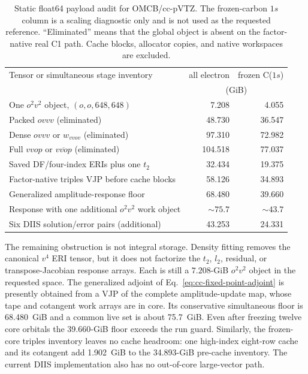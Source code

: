 \documentclass[11pt]{article}
\begin{document}
\begin{table}[htbp]
 \centering
 \caption{Static float64 payload audit for OMCB/cc-pVTZ.  The frozen-carbon
 $1s$ column is a scaling diagnostic only and is not used as the requested
 reference.  ``Eliminated'' means that the global object is absent on the
 factor-native real C1 path.  Cache blocks, allocator copies, and native
 workspaces are excluded.}
 \label{tab:omcb-ccpvtz-cc-memory}
 \scriptsize
 \setlength{\tabcolsep}{4pt}
 \begin{tabular}{@{}lrr@{}}
  \toprule
  Tensor or simultaneous stage inventory & all electron & frozen C($1s$) \\
   & \multicolumn{2}{c}{(GiB)} \\
  \midrule
  One $o^2v^2$ object, $(o,o,648,648)$ & 7.208 & 4.055 \\
  Packed $ovvv$ (eliminated) & 48.730 & 36.547 \\
  Dense $ovvv$ or $w_{vvov}$ (eliminated) & 97.310 & 72.982 \\
  Full $vvop$ or $\overline{vvop}$ (eliminated) & 104.518 & 77.037 \\
  Saved DF/four-index ERIs plus one $t_2$ & 32.434 & 19.375 \\
  Factor-native triples VJP before cache blocks & 58.126 & 34.893 \\
  Generalized amplitude-response floor & 68.480 & 39.660 \\
  Response with one additional $o^2v^2$ work object & $\sim75.7$ & $\sim43.7$ \\
  Six DIIS solution/error pairs (additional) & 43.253 & 24.331 \\
  \bottomrule
 \end{tabular}
\end{table}

The remaining obstruction is not integral storage.  Density fitting removes
the canonical $v^4$ ERI tensor, but it does not factorize the $t_2$, $l_2$,
residual, or transpose-Jacobian response arrays.  Each is still a
$7.208$-GiB $o^2v^2$ object in the requested space.  The generalized adjoint
of Eq.~\eqref{eq:cc-fixed-point-adjoint} is presently obtained from a VJP of
the complete amplitude-update map, whose tape and cotangent work arrays are
in core.  Its conservative simultaneous floor is 68.480~GiB and a common
live set is about 75.7~GiB.  Even after freezing twelve core orbitals the
39.660-GiB floor exceeds the run guard.  Similarly, the frozen-core triples
inventory leaves no cache headroom: one high-index eight-row cache and its
cotangent add 1.902~GiB to the 34.893-GiB pre-cache inventory.  The current
DIIS implementation also has no out-of-core large-vector path.
\end{document}
